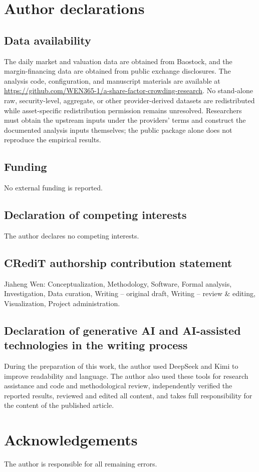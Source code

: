 \documentclass[final,1p,authoryear]{elsarticle}
\begin{document}
\section*{Author declarations}

\subsection*{Data availability}
\noindent The daily market and valuation data are obtained from Baostock, and the margin-financing
data are obtained from public exchange disclosures. The analysis code, configuration, and
manuscript materials are available at
\url{https://github.com/WEN365-1/a-share-factor-crowding-research}. No stand-alone raw,
security-level, aggregate, or other provider-derived datasets are redistributed while
asset-specific redistribution permission remains unresolved. Researchers must obtain the
upstream inputs under the providers' terms and construct the documented analysis inputs
themselves; the public package alone does not reproduce the empirical results.

\subsection*{Funding}
\noindent No external funding is reported.

\subsection*{Declaration of competing interests}
\noindent The author declares no competing interests.

\subsection*{CRediT authorship contribution statement}
\noindent Jiaheng Wen: Conceptualization, Methodology, Software, Formal analysis, Investigation, Data
curation, Writing -- original draft, Writing -- review \& editing, Visualization, Project
administration.

\subsection*{Declaration of generative AI and AI-assisted technologies in the writing process}
\noindent During the preparation of this work, the author used DeepSeek and Kimi to improve
readability and language. The author also used these tools for research assistance and code and
methodological review, independently verified the reported results, reviewed and edited all
content, and takes full responsibility for the content of the published article.

\section*{Acknowledgements}
\noindent The author is responsible for all remaining errors.



\end{document}
